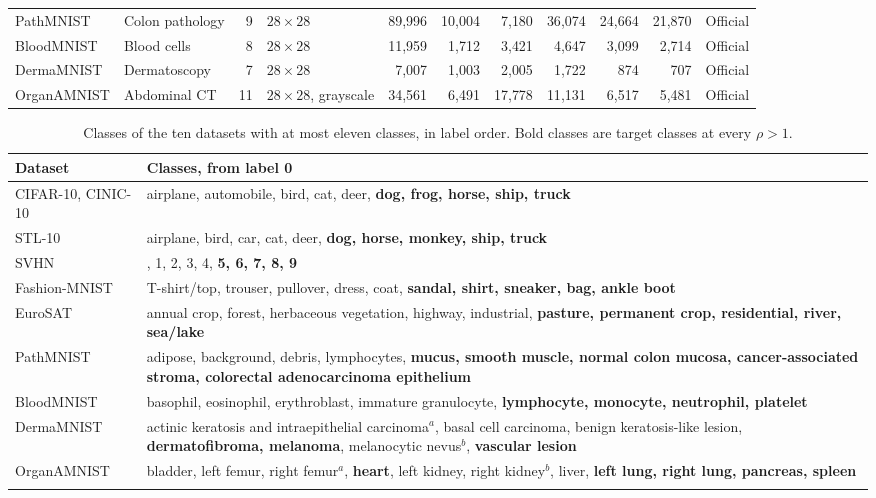 \documentclass[10pt,journal,compsoc]{IEEEtran}
\theoremstyle{definition}
\begin{document}
\begin{table}[!t]
\begin{tabular}{@{}llrlrrrrrrl@{}}
\midrule
PathMNIST     & Colon pathology & 9  & $28\times28$              & 89{,}996 & 10{,}004 & 7{,}180  & 36{,}074 & 24{,}664 & 21{,}870 & Official \\
BloodMNIST    & Blood cells    & 8   & $28\times28$              & 11{,}959 & 1{,}712  & 3{,}421  & 4{,}647  & 3{,}099  & 2{,}714  & Official \\
DermaMNIST    & Dermatoscopy   & 7   & $28\times28$              & 7{,}007  & 1{,}003  & 2{,}005  & 1{,}722  & 874      & 707      & Official \\
OrganAMNIST   & Abdominal CT   & 11  & $28\times28$, grayscale   & 34{,}561 & 6{,}491  & 17{,}778 & 11{,}131 & 6{,}517  & 5{,}481  & Official \\
\bottomrule
\end{tabular}
\end{table}

\begin{table}[t]
\caption{Classes of the ten datasets with at most eleven classes, in
label order. Bold classes are target classes at every $\rho>1$.}
\label{tab:dataset-classes}
\centering
\footnotesize
\setlength{\tabcolsep}{3pt}
\renewcommand{\arraystretch}{1.1}
\begin{tabular}{@{}>{\raggedright\arraybackslash}p{2cm}%
>{\raggedright\arraybackslash}p{}@{}}
\toprule
Dataset & Classes, from label 0 \\
\midrule
CIFAR-10, CINIC-10 & airplane, automobile, bird, cat, deer,
\textbf{dog, frog, horse, ship, truck} \\
STL-10 & airplane, bird, car, cat, deer,
\textbf{dog, horse, monkey, ship, truck} \\
SVHN & 0, 1, 2, 3, 4, \textbf{5, 6, 7, 8, 9} \\
Fashion-MNIST & T-shirt/top, trouser, pullover, dress, coat,
\textbf{sandal, shirt, sneaker, bag, ankle boot} \\
EuroSAT & annual crop, forest, herbaceous vegetation, highway,
industrial, \textbf{pasture, permanent crop, residential, river,
sea/lake} \\
PathMNIST & adipose, background, debris, lymphocytes, \textbf{mucus,
smooth muscle, normal colon mucosa, cancer-associated stroma,
colorectal adenocarcinoma epithelium} \\
BloodMNIST & basophil, eosinophil, erythroblast, immature granulocyte,
\textbf{lymphocyte, monocyte, neutrophil, platelet} \\
DermaMNIST & actinic keratosis and intraepithelial carcinoma$^{a}$,
basal cell carcinoma, benign keratosis-like lesion,
\textbf{dermatofibroma, melanoma}, melanocytic nevus$^{b}$,
\textbf{vascular lesion} \\
OrganAMNIST & bladder, left femur, right femur$^{a}$, \textbf{heart},
left kidney, right kidney$^{b}$, liver, \textbf{left lung, right lung,
pancreas, spleen} \\
\bottomrule
\multicolumn{2}{@{}l}{$^{a}$Target only at $\rho=10$.\quad
$^{b}$Target only at $\rho=50$ and $\rho=100$.} \\
\end{tabular}
\end{table}
\end{document}
